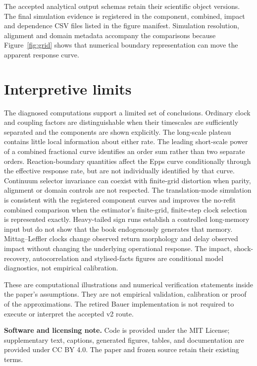 \documentclass[11pt]{article}
\begin{document}
The accepted analytical output schemas retain their scientific object versions. The final simulation evidence is registered in the component, combined, impact and dependence CSV files listed in the figure manifest. Simulation resolution, alignment and domain metadata accompany the comparisons because Figure~\ref{fig:grid} shows that numerical boundary representation can move the apparent response curve.

\section{Interpretive limits}

The diagnosed computations support a limited set of conclusions. Ordinary clock and coupling factors are distinguishable when their timescales are sufficiently separated and the components are shown explicitly. The long-scale plateau contains little local information about either rate. The leading short-scale power of a combined fractional curve identifies an order sum rather than two separate orders. Reaction-boundary quantities affect the Epps curve conditionally through the effective response rate, but are not individually identified by that curve. Continuum selector invariance can coexist with finite-grid distortion when parity, alignment or domain controls are not respected. The translation-mode simulation is consistent with the registered component curves and improves the no-refit combined comparison when the estimator's finite-grid, finite-step clock selection is represented exactly. Heavy-tailed sign runs establish a controlled long-memory input but do not show that the book endogenously generates that memory. Mittag--Leffler clocks change observed return morphology and delay observed impact without changing the underlying operational response. The impact, shock-recovery, autocorrelation and stylised-facts figures are conditional model diagnostics, not empirical calibration.

These are computational illustrations and numerical verification statements inside the paper's assumptions. They are not empirical validation, calibration or proof of the approximations. The retired Bauer implementation is not required to execute or interpret the accepted v2 route.

\medskip
\noindent\textbf{Software and licensing note.} Code is provided under the MIT License; supplementary text, captions, generated figures, tables, and documentation are provided under CC BY 4.0. The paper and frozen source retain their existing terms.
\end{document}
